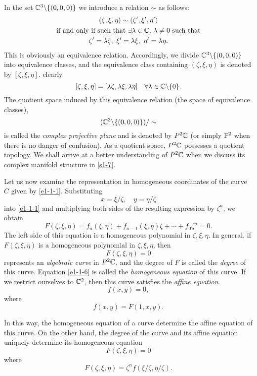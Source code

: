 In the set $\C^3\backslash\{(0,0,0)\}$ we introduce a relation $\sim$ as follows: 
\begin{equation}\label{e1-1-5}
    \begin{gathered}
        (\zeta,\xi,\eta)\sim(\zeta',\xi',\eta')\\
        \text{if and only if such that $\exists\lambda\in\C$, $\lambda\neq0$ such that}\\
        \zeta'=\lambda\zeta, \ \xi'=\lambda\xi, \ \eta'=\lambda\eta. 
    \end{gathered}
\end{equation}
This is obviously an equivalence relation. Accordingly, we divide $\C^3\backslash\{(0,0,0)\}$ into equivalence classes, and the equivalence class containing $(\zeta,\xi,\eta)$ is denoted by $[\zeta,\xi,\eta]$. clearly
\[[\zeta,\xi,\eta]=[\lambda\zeta,\lambda\xi,\lambda\eta]\quad\forall\lambda\in\C\backslash\{0\}. \]
The quotient space induced by this equivalence relation (the space of equivalence classes), 
\[(\C^3\backslash\{(0,0,0)\})/\sim\]
is called the \textit{complex projective plane} and is denoted by $P^2\C$ (or simply $\P^2$ when there is no danger of confusion). As a quotient space, $P^2\C$ possesses a quotient topology. We shall arrive at a better understanding of $P^2\C$ when we discuss its complex manifold structure in \autoref{s1-7}. 

Let us now examine the representation in homogeneous coordinates of the curve $C$ given by \eqref{e1-1-1}. Substituting 
\[x=\xi/\zeta, \quad y=\eta/\zeta\]
into \eqref{e1-1-1} and multiplying both sides of the resulting expression by $\zeta^n$, we obtain 
\[F(\zeta,\xi,\eta)=f_n(\xi,\eta)+f_{n-1}(\xi,\eta)\zeta+\cdots+f_0\zeta^n=0. \]
The left side of this equation is a homogeneous polynomial in $\zeta,\xi,\eta$. In general, if $F(\zeta,\xi,\eta)$ is a homogeneous polynomial in $\zeta,\xi,\eta$, then 
\begin{equation}\label{e1-1-6}
    F(\zeta,\xi,\eta)=0
\end{equation}
represents an \textit{algebraic curve} in $P^2\C$, and the degree of $F$ is called the \textit{degree} of this curve. Equation \eqref{e1-1-6} is called the \textit{homogeneous equation} of this curve. If we restrict ourselves to $\C^2$, then this curve satisfies the \textit{affine equation} 
\begin{equation}\label{e1-1-7}
    f(x,y)=0, 
\end{equation}
where 
\[f(x,y)=F(1,x,y). \]

In this way, the homogeneous equation of a curve determine the affine equation of this curve. On the other hand, the degree of the curve and its affine equation uniquely determine its homogeneous equation 
\[F(\zeta,\xi,\eta)=0\]
where 
\[F(\zeta,\xi,\eta)=\zeta^n f(\xi/\zeta,\eta/\zeta). \]

